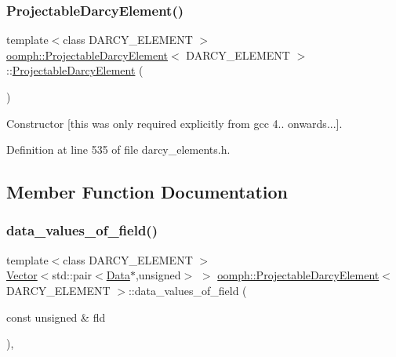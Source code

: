 \subsubsection{\texorpdfstring{Projectable\+Darcy\+Element()}{ProjectableDarcyElement()}}
{\footnotesize\ttfamily template$<$class D\+A\+R\+C\+Y\+\_\+\+E\+L\+E\+M\+E\+NT $>$ \\
\hyperlink{classoomph_1_1ProjectableDarcyElement}{oomph\+::\+Projectable\+Darcy\+Element}$<$ D\+A\+R\+C\+Y\+\_\+\+E\+L\+E\+M\+E\+NT $>$\+::\hyperlink{classoomph_1_1ProjectableDarcyElement}{Projectable\+Darcy\+Element} (\begin{DoxyParamCaption}{ }\end{DoxyParamCaption})\hspace{0.3cm}{\ttfamily [inline]}}



Constructor \mbox{[}this was only required explicitly from gcc 4.. onwards...\mbox{]}. 



Definition at line 535 of file darcy\+\_\+elements.\+h.



\subsection{Member Function Documentation}
\mbox{\label{classoomph_1_1ProjectableDarcyElement_aa430ac36ed6a03558d66cae979b57a3f}} 
\subsubsection{\texorpdfstring{data\+\_\+values\+\_\+of\+\_\+field()}{data\_values\_of\_field()}}
{\footnotesize\ttfamily template$<$class D\+A\+R\+C\+Y\+\_\+\+E\+L\+E\+M\+E\+NT $>$ \\
\hyperlink{classoomph_1_1Vector}{Vector}$<$std\+::pair$<$\hyperlink{classoomph_1_1Data}{Data}$\ast$,unsigned$>$ $>$ \hyperlink{classoomph_1_1ProjectableDarcyElement}{oomph\+::\+Projectable\+Darcy\+Element}$<$ D\+A\+R\+C\+Y\+\_\+\+E\+L\+E\+M\+E\+NT $>$\+::data\+\_\+values\+\_\+of\+\_\+field (\begin{DoxyParamCaption}\item[{const unsigned \&}]{fld }\end{DoxyParamCaption})\hspace{0.3cm}{\ttfamily [inline]}, {\ttfamily [virtual]}}



